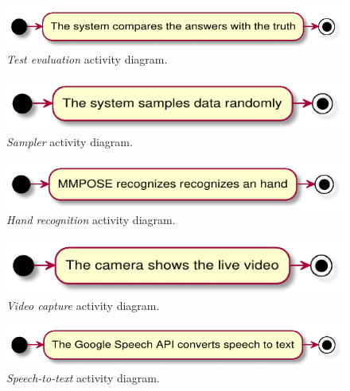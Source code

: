 \begin{figure}[h!t]
    \centering
    \includegraphics[scale=0.8]{assets/plantuml/pdf/activity/eval.pdf}
    \caption{\emph{Test evaluation} activity diagram.}
    \label{fig:activity:eval}
\end{figure}

\begin{figure}[h!t]
    \centering
    \includegraphics[scale=0.8]{assets/plantuml/pdf/activity/sampler.pdf}
    \caption{\emph{Sampler} activity diagram.}
    \label{fig:activity:sampler}
\end{figure}

\begin{figure}[h!t]
    \centering
    \includegraphics[scale=0.8]{assets/plantuml/pdf/activity/hand.pdf}
    \caption{\emph{Hand recognition} activity diagram.}
    \label{fig:activity:hand}
\end{figure}

\begin{figure}[h!t]
    \centering
    \includegraphics[scale=0.8]{assets/plantuml/pdf/activity/video.pdf}
    \caption{\emph{Video capture} activity diagram.}
    \label{fig:activity:video}
\end{figure}

\begin{figure}[h!t]
    \centering
    \includegraphics[scale=0.8]{assets/plantuml/pdf/activity/speech.pdf}
    \caption{\emph{Speech-to-text} activity diagram.}
    \label{fig:activity:speech}
\end{figure}


